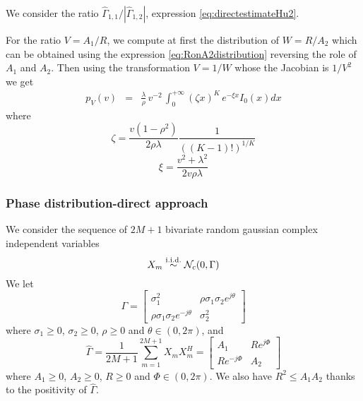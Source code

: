 We consider the ratio $\hat \Gamma_{1,1}/|\hat \Gamma_{1,2}|$, expression \eqref{eq:directestimateHu2}.

For the ratio $V=A_{1}/R$, we compute at first the distribution of $W=R/A_{2}$ which can be obtained using the expression \eqref{eq:RonA2distribution} reversing the role of $A_{1}$ and $A_{2}$. Then using the transformation $V=1/W$ whose the Jacobian is $1/V^{2}$ we get
\begin{eqnarray}
 \label{eq:A1onRdistribution}
p_{V}(v)
 &=&  \frac{\lambda}{\rho}\,v^{-2}\,
 \int_{0}^{+\infty}(\zeta x)^{K} \,e^{-\xi x}I_{0}(x)dx
\end{eqnarray}
where
$$
 \zeta = \frac{v(1-\rho^{2})}{2\rho\lambda}\frac{1}{((K-1)!)^{1/K}}
$$
$$
 \xi = \frac{v^{2}+\lambda^{2}}{2v\rho\lambda}
$$


\subsubsection{Phase distribution-direct approach}
We consider the sequence of $2M+1$ bivariate random gaussian complex independent variables
$$
 X_{m}\stackrel{\mathrm{i.i.d.}}{\sim}\mathcal{N}_{c}(0,\Gamma)
$$
We let
$$
 \Gamma =
 \begin{bmatrix}
 \sigma_{1}^{2}&\rho \sigma_{1}\sigma_{2}e^{j\theta}
 \\
 \rho \sigma_{1}\sigma_{2}e^{-j\theta}&\sigma_{2}^{2}
 \end{bmatrix}
$$
where $\sigma_{1}\geq 0$, $\sigma_{2}\geq 0$, $\rho\geq 0$ and $\theta\in(0,2\pi)$, 
and
$$
 \hat\Gamma=\frac{1}{2M+1}\sum_{m=1}^{2M+1}X_{m}X_{m}^{H}=\begin{bmatrix}
 A_{1}%
 &
 R e^{j\Phi}%
 \\
 R e^{-j\Phi}%
 &
 A_{2}%
 \end{bmatrix}
$$
where $A_{1}\geq 0$, $A_{2}\geq 0$, $R\geq 0$ and $\Phi\in(0,2\pi)$. We also have $R^{2}\leq A_{1}A_{2}$ thanks to the positivity of $\hat\Gamma$.


